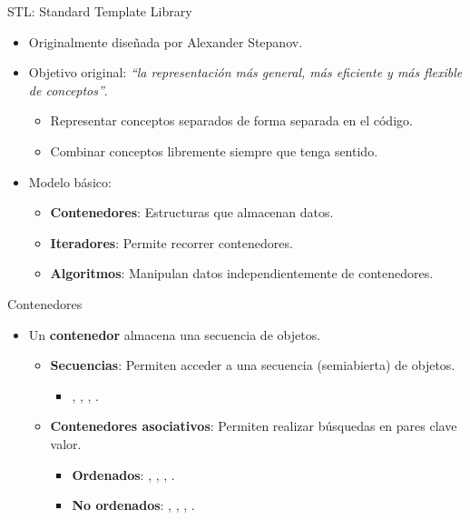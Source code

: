 \begin{frame}[t]{STL: Standard Template Library}
\begin{itemize}
  \item Originalmente diseñada por Alexander Stepanov.
  \item Objetivo original: \emph{``la representación más general,
        más eficiente y más flexible de conceptos''}.
    \begin{itemize}
      \item Representar conceptos separados de forma separada en el código.
      \item Combinar conceptos libremente siempre que tenga sentido.
    \end{itemize}
  \item Modelo básico:
    \begin{itemize}
      \item \textbf{Contenedores}: Estructuras que almacenan datos.
      \item \textbf{Iteradores}: Permite recorrer contenedores.
      \item \textbf{Algoritmos}: Manipulan datos independientemente de contenedores.
    \end{itemize}
\end{itemize}
\end{frame}

\begin{frame}[t]{Contenedores}
\begin{itemize}
  \item Un \textbf{contenedor} almacena una secuencia de objetos.
  \begin{itemize}
    \item \textbf{Secuencias}: Permiten acceder a una secuencia (semiabierta) de objetos.
       \begin{itemize}
         \item {}, , , .
       \end{itemize}
    \item \textbf{Contenedores asociativos}: Permiten realizar búsquedas en pares clave valor.
      \begin{itemize}
        \item \textbf{Ordenados}: , , 
                                  , .
        \item \textbf{No ordenados}: , , 
                                     , .
      \end{itemize}
  \end{itemize}
\end{itemize}
\end{frame}

